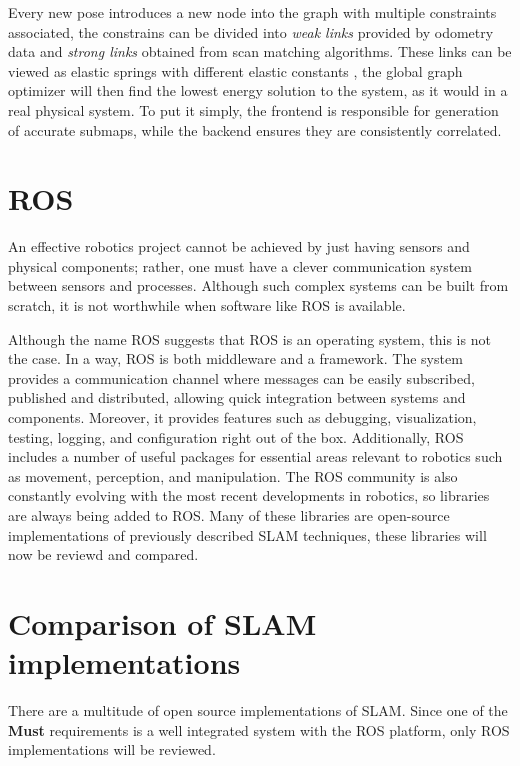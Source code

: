 Every new pose introduces a new node into the graph with multiple constraints associated, the constrains can be divided into \textit{weak links} provided by odometry data and \textit{strong links} obtained from scan matching algorithms. These links can be viewed as elastic springs with different elastic constants \cite{lu_globally_1997}, the global graph optimizer will then find the lowest energy solution to the system, as it would in a real physical system. To put it simply, the frontend is responsible for generation of accurate submaps, while the backend ensures they are consistently correlated.


\section{\acs{ROS}}

An effective robotics project cannot be achieved by just having sensors and physical components; rather, one must have a clever communication system between sensors and processes. Although such complex systems can be built from scratch, it is not worthwhile when software like \acs*{ROS} is available.

Although the name \acl*{ROS} suggests that ROS is an operating system, this is not the case.  In a way, \acs*{ROS} is both middleware and a framework. The system provides a communication channel where messages can be easily subscribed, published and distributed, allowing quick integration between systems and components. Moreover, it provides features such as debugging, visualization, testing, logging, and configuration right out of the box. Additionally, ROS includes a number of useful packages for essential areas relevant to robotics such as movement, perception, and manipulation. The ROS community is also constantly evolving with the most recent developments in robotics, so libraries are always being added to ROS. Many of these libraries are open-source implementations of previously described \acs*{SLAM} techniques, these libraries will now be reviewd and compared.


\section{Comparison of \acs*{SLAM} implementations}

There are a multitude of open source implementations of \acs*{SLAM}. Since one of the \textbf{Must} requirements is a well integrated system with the \acs*{ROS} platform, only \acs*{ROS} implementations will be reviewed. 


